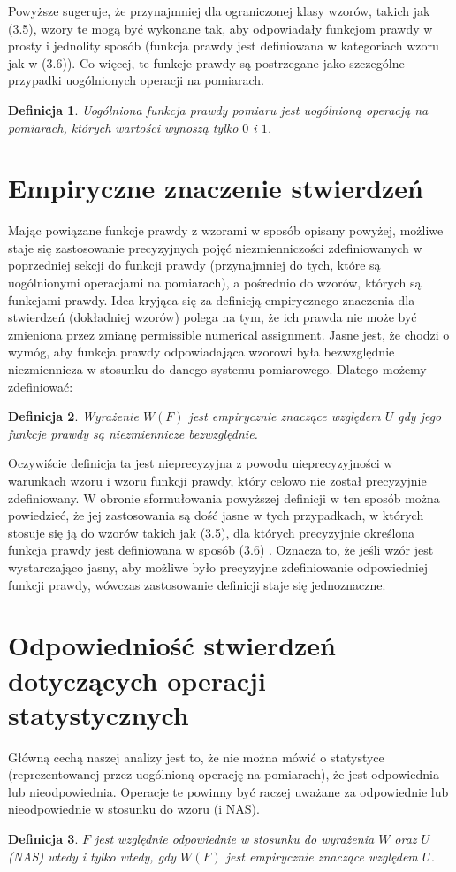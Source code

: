 \documentclass[12pt,a4paper]{report}
\newtheorem{definition}{Definicja}[chapter]
\begin{document}
Powyższe sugeruje, że przynajmniej dla ograniczonej klasy wzorów, takich jak (3.5), wzory te mogą być wykonane tak, aby odpowiadały funkcjom prawdy w prosty i jednolity sposób (funkcja prawdy jest definiowana w kategoriach wzoru jak w (3.6)). Co więcej, te funkcje prawdy są postrzegane jako szczególne przypadki uogólnionych operacji na pomiarach.
\begin{definition}
Uogólniona funkcja prawdy pomiaru jest uogólnioną operacją na pomiarach, których wartości wynoszą tylko $0$ i $1$.
\end{definition}
\section{Empiryczne znaczenie stwierdzeń}

Mając powiązane funkcje prawdy z wzorami w sposób opisany powyżej, możliwe staje się zastosowanie precyzyjnych pojęć niezmienniczości zdefiniowanych w poprzedniej sekcji do funkcji prawdy (przynajmniej do tych, które są uogólnionymi operacjami na pomiarach), a pośrednio do wzorów, których są funkcjami prawdy. Idea kryjąca się za definicją empirycznego znaczenia dla stwierdzeń (dokładniej wzorów) polega na tym, że ich prawda nie może być zmieniona przez zmianę permissible numerical assignment. Jasne jest, że chodzi o wymóg, aby funkcja prawdy odpowiadająca wzorowi była bezwzględnie niezmiennicza w stosunku do danego systemu pomiarowego. Dlatego możemy zdefiniować:
\begin{definition}
Wyrażenie $W(F)$ jest empirycznie znaczące względem $U$ gdy jego funkcje prawdy są niezmiennicze bezwzględnie.
\end{definition}
Oczywiście definicja ta jest nieprecyzyjna z powodu nieprecyzyjności w warunkach wzoru i wzoru funkcji prawdy, który celowo nie został precyzyjnie zdefiniowany. W obronie sformułowania powyższej definicji w ten sposób można powiedzieć, że jej zastosowania są dość jasne w tych przypadkach, w których stosuje się ją do wzorów takich jak (3.5), dla których precyzyjnie określona funkcja prawdy jest definiowana w sposób (3.6) . Oznacza to, że jeśli wzór jest wystarczająco jasny, aby możliwe było precyzyjne zdefiniowanie odpowiedniej funkcji prawdy, wówczas zastosowanie definicji staje się jednoznaczne.
\section{Odpowiedniość stwierdzeń dotyczących operacji statystycznych}

Główną cechą naszej analizy jest to, że nie można mówić o statystyce (reprezentowanej przez uogólnioną operację na pomiarach), że jest odpowiednia lub nieodpowiednia. Operacje te powinny być raczej uważane za odpowiednie lub nieodpowiednie w stosunku do wzoru (i NAS).
\begin{definition}
$F$ jest względnie odpowiednie w stosunku do wyrażenia $W$ oraz $U$ (NAS) wtedy i tylko wtedy, gdy $W(F)$ jest empirycznie znaczące względem $U$.
\end{definition}
\end{document}
